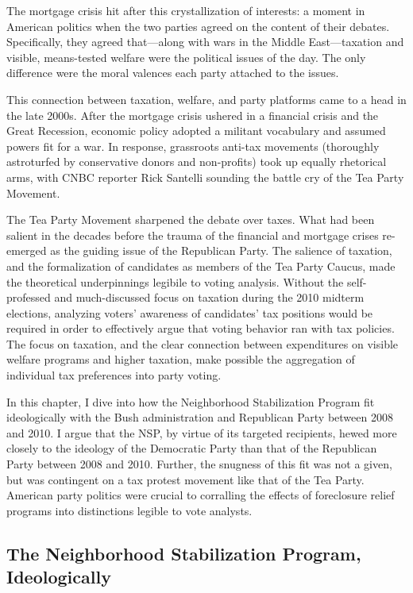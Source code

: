 \documentclass[
]{article}
\begin{document}
The mortgage crisis hit after this crystallization of interests: a moment in American politics when the two parties agreed on the content of their debates.
Specifically, they agreed that---along with wars in the Middle East---taxation and visible, means-tested welfare were the political issues of the day.
The only difference were the moral valences each party attached to the issues.

This connection between taxation, welfare, and party platforms came to a head in the late 2000s.
After the mortgage crisis ushered in a financial crisis and the Great Recession, economic policy adopted a militant vocabulary and assumed powers fit for a war.
In response, grassroots anti-tax movements (thoroughly astroturfed by conservative donors and non-profits) took up equally rhetorical arms, with CNBC reporter Rick Santelli sounding the battle cry of the Tea Party Movement.

The Tea Party Movement sharpened the debate over taxes.
What had been salient in the decades before the trauma of the financial and mortgage crises re-emerged as the guiding issue of the Republican Party.
The salience of taxation, and the formalization of candidates as members of the Tea Party Caucus, made the theoretical underpinnings legibile to voting analysis.
Without the self-professed and much-discussed focus on taxation during the 2010 midterm elections, analyzing voters' awareness of candidates' tax positions would be required in order to effectively argue that voting behavior ran with tax policies.
The focus on taxation, and the clear connection between expenditures on visible welfare programs and higher taxation, make possible the aggregation of individual tax preferences into party voting.

In this chapter, I dive into how the Neighborhood Stabilization Program fit ideologically with the Bush administration and Republican Party between 2008 and 2010.
I argue that the NSP, by virtue of its targeted recipients, hewed more closely to the ideology of the Democratic Party than that of the Republican Party between 2008 and 2010.
Further, the snugness of this fit was not a given, but was contingent on a tax protest movement like that of the Tea Party.
American party politics were crucial to corralling the effects of foreclosure relief programs into distinctions legible to vote analysts.

\hypertarget{the-neighborhood-stabilization-program-ideologically}{%
\subsection{The Neighborhood Stabilization Program, Ideologically}\label{the-neighborhood-stabilization-program-ideologically}}
\end{document}
